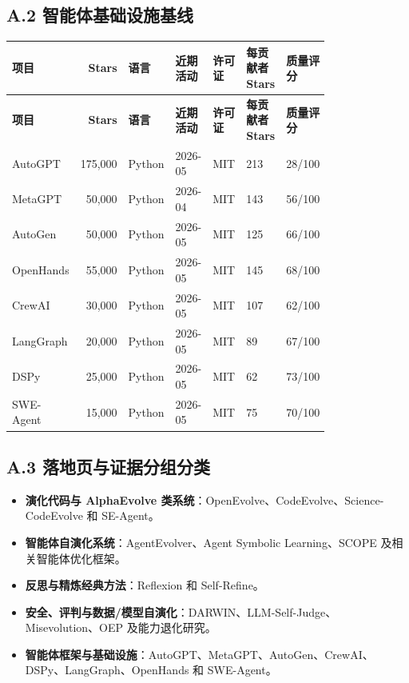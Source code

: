 \subsection*{A.2 智能体基础设施基线}

{\TableTight
\begin{longtable}{@{}L{0.16\linewidth}r L{0.11\linewidth}L{0.12\linewidth}L{0.11\linewidth}L{0.17\linewidth}L{0.12\linewidth}@{}}
\toprule
\textbf{项目} & \textbf{Stars} & \textbf{语言} & \textbf{近期活动} & \textbf{许可证} & \textbf{每贡献者 Stars} & \textbf{质量评分} \\
\midrule
\endfirsthead
\toprule
\textbf{项目} & \textbf{Stars} & \textbf{语言} & \textbf{近期活动} & \textbf{许可证} & \textbf{每贡献者 Stars} & \textbf{质量评分} \\
\midrule
\endhead
\bottomrule
\endlastfoot
AutoGPT & 175,000 & Python & 2026-05 & MIT & 213 & 28/100 \\
MetaGPT & 50,000 & Python & 2026-04 & MIT & 143 & 56/100 \\
AutoGen & 50,000 & Python & 2026-05 & MIT & 125 & 66/100 \\
OpenHands & 55,000 & Python & 2026-05 & MIT & 145 & 68/100 \\
CrewAI & 30,000 & Python & 2026-05 & MIT & 107 & 62/100 \\
LangGraph & 20,000 & Python & 2026-05 & MIT & 89 & 67/100 \\
DSPy & 25,000 & Python & 2026-05 & MIT & 62 & 73/100 \\
SWE-Agent & 15,000 & Python & 2026-05 & MIT & 75 & 70/100 \\
\end{longtable}}

\subsection*{A.3 落地页与证据分组分类}

\begin{itemize}
\item \textbf{演化代码与 AlphaEvolve 类系统}：OpenEvolve、CodeEvolve、Science-CodeEvolve 和 SE-Agent。
\item \textbf{智能体自演化系统}：AgentEvolver、Agent Symbolic Learning、SCOPE 及相关智能体优化框架。
\item \textbf{反思与精炼经典方法}：Reflexion 和 Self-Refine。
\item \textbf{安全、评判与数据/模型自演化}：DARWIN、LLM-Self-Judge、Misevolution、OEP 及能力退化研究。
\item \textbf{智能体框架与基础设施}：AutoGPT、MetaGPT、AutoGen、CrewAI、DSPy、LangGraph、OpenHands 和 SWE-Agent。
\end{itemize}

